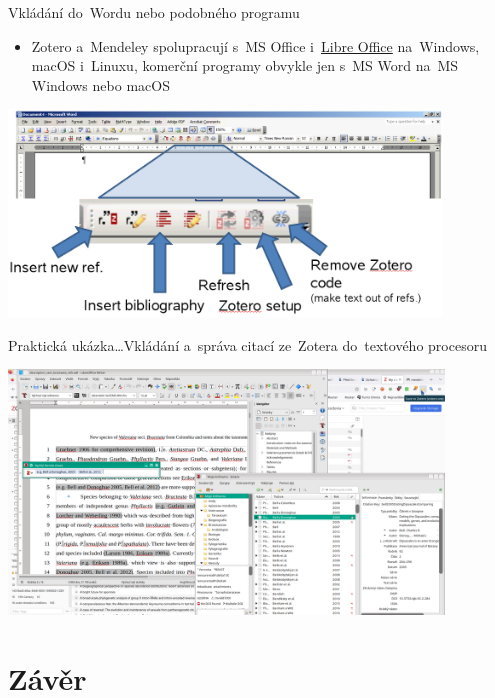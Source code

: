 \documentclass[compress, ucs, xelatex, 11pt, xcolor=svgnames, aspectratio=169,
	hyperref={
		bookmarks=true,
		unicode=true,
		colorlinks=true,
		pdftitle={Citacni software},
		plainpages=false,
		pdfauthor={Vojtech Zeisek},
		pdfsubject={Kratky uvod do citacniho software},
		pdfcreator={XeLaTeX},
		pdfkeywords={citace, reference, software, literatura},
		linkcolor=Crimson, %
		anchorcolor=Magenta, %
		citecolor=Magenta, %
		filecolor=Magenta, %
		menucolor=Magenta, %
		urlcolor=DarkTurquoise, %
		pdftex},
	url={hyphens, lowtilde} %
	]{beamer}
\begin{document}
\begin{frame}{Vkládání do~Wordu nebo podobného programu}
	\begin{itemize}
		\item Zotero a~Mendeley spolupracují s~MS Office i~\href{https://cs.libreoffice.org/}{Libre Office} na~Windows, macOS i~Linuxu, komerční programy obvykle jen s~MS Word na~MS Windows nebo macOS
	\end{itemize}
	\begin{center}
		\includegraphics[height=5.5cm]{zotero_lista.png}
	\end{center}
\end{frame}

\begin{frame}{Praktická ukázka\ldots}{Vkládání a~správa citací ze~Zotera do~textového procesoru}
	\begin{center}
		\includegraphics[height=6.5cm]{zotero_writer_knihovna.png}
	\end{center}
\end{frame}

\section{Závěr}
\end{document}
